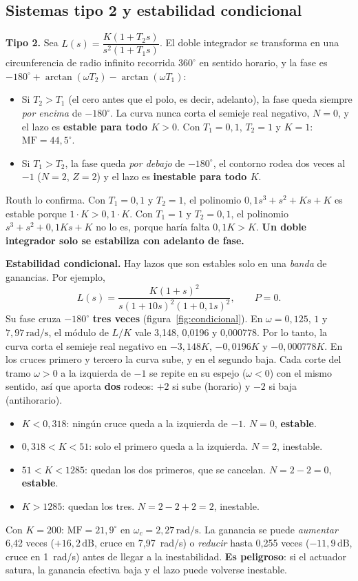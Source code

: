 \documentclass[11pt,a4paper]{article}
\newcounter{ejemplo}
\newcommand{\dB}{\,\mathrm{dB}}
\newcommand{\rads}{\,\mathrm{rad/s}}
\newcommand{\MF}{\mathrm{MF}}
\newcommand{\wc}{\omega_c}
\begin{document}
\subsection{Sistemas tipo 2 y estabilidad condicional}
\label{sec:condicional}
\textbf{Tipo 2.} Sea $L(s)=\dfrac{K(1+T_2s)}{s^2(1+T_1s)}$. El doble integrador se transforma en una circunferencia de radio infinito
recorrida $360^\circ$ en sentido horario, y la fase es $-180^\circ+\arctan(\omega T_2)-\arctan(\omega T_1)$:
\begin{itemize}
\item Si $T_2>T_1$ (el cero antes que el polo, es decir, adelanto), la fase queda siempre \emph{por encima} de $-180^\circ$. La curva nunca corta
      el semieje real negativo, $N=0$, y el lazo es \textbf{estable para todo $K>0$}. Con $T_1=0{,}1$, $T_2=1$ y $K=1$: $\MF=44{,}5^\circ$.
\item Si $T_1>T_2$, la fase queda \emph{por debajo} de $-180^\circ$, el contorno rodea dos veces al $-1$ ($N=2$, $Z=2$) y el lazo es
      \textbf{inestable para todo $K$}.
\end{itemize}
Routh lo confirma. Con $T_1=0{,}1$ y $T_2=1$, el polinomio $0{,}1s^3+s^2+Ks+K$ es estable porque $1\cdot K>0{,}1\cdot K$.
Con $T_1=1$ y $T_2=0{,}1$, el polinomio $s^3+s^2+0{,}1Ks+K$ no lo es, porque haría falta $0{,}1K>K$.
\textbf{Un doble integrador solo se estabiliza con adelanto de fase.}

\textbf{Estabilidad condicional.} Hay lazos que son estables solo en una \emph{banda} de ganancias. Por ejemplo,
\[
L(s)=\frac{K(1+s)^2}{s(1+10s)^2(1+0{,}1s)^2},\qquad P=0.
\]
Su fase cruza $-180^\circ$ \textbf{tres veces} (figura~\ref{fig:condicional}). En $\omega=0{,}125$, $1$ y $7{,}97\rads$, el módulo de $L/K$ vale
3,148, 0,0196 y 0,000778. Por lo tanto, la curva corta el semieje real negativo en $-3{,}148K$, $-0{,}0196K$ y $-0{,}000778K$.
En los cruces primero y tercero la curva sube, y en el segundo baja. Cada corte del tramo $\omega>0$ a la izquierda de $-1$ se repite en su
espejo ($\omega<0$) con el mismo sentido, así que aporta \textbf{dos} rodeos: $+2$ si sube (horario) y $-2$ si baja (antihorario).
\begin{itemize}
\item $K<0{,}318$: ningún cruce queda a la izquierda de $-1$. $N=0$, \textbf{estable}.
\item $0{,}318<K<51$: solo el primero queda a la izquierda. $N=2$, inestable.
\item $51<K<1285$: quedan los dos primeros, que se cancelan. $N=2-2=0$, \textbf{estable}.
\item $K>1285$: quedan los tres. $N=2-2+2=2$, inestable.
\end{itemize}
Con $K=200$: $\MF=21{,}9^\circ$ en $\wc=2{,}27\rads$. La ganancia se puede \emph{aumentar} 6,42 veces ($+16{,}2\dB$, cruce en 7,97~rad/s)
o \emph{reducir} hasta 0,255 veces ($-11{,}9\dB$, cruce en 1~rad/s) antes de llegar a la inestabilidad.
\textbf{Es peligroso}: si el actuador satura, la ganancia efectiva baja y el lazo puede volverse inestable.
\end{document}
